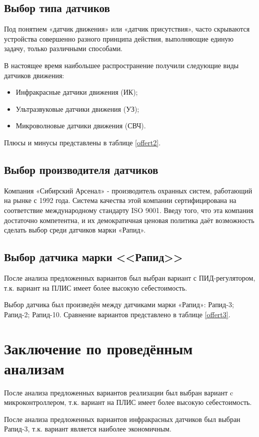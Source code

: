 		\subsection{Выбор типа датчиков}
			Под понятием «датчик движения» или «датчик присутствия», часто скрываются устройства совершенно разного принципа действия, выполняющие единую задачу, только различными способами.

			В настоящее время наибольшее распространение получили следующие виды датчиков движения:
			\begin{itemize}
				\item Инфракрасные датчики движения (ИК);
				\item Ультразвуковые датчики движения (УЗ);
				\item Микроволновые датчики движения (СВЧ).
			\end{itemize}
			Плюсы и минусы представлены в таблице \ref{offert2}.
			
		\subsection{Выбор производителя датчиков}
			Компания «Сибирский Арсенал» - производитель охранных систем, работающий на рынке с 1992 года. Система качества этой компании сертифицирована на соответствие международному стандарту ISO 9001.
			Введу того, что эта компания достаточно компетентна, и их демократичная ценовая политика даёт возможность сделать выбор среди датчиков марки «Рапид».
		\subsection{Выбор датчика марки <<Рапид>>}
			После анализа предложенных вариантов был выбран вариант с ПИД-регулятором, т.к. вариант на ПЛИС имеет более высокую себестоимость.

			Выбор датчика был произведён между датчиками марки «Рапид»: Рапид-3; Рапид-2; Рапид-10. Сравнение вариантов представлено в таблице \ref{offert3}.
			
	\section{Заключение по проведённым анализам}
		После анализа предложенных вариантов реализации был выбран вариант c микроконтроллером, т.к. вариант на ПЛИС имеет более высокую себестоимость.

		После анализа предложенных вариантов инфракрасных датчиков был выбран  Рапид-3, т.к. вариант является наиболее экономичным.
